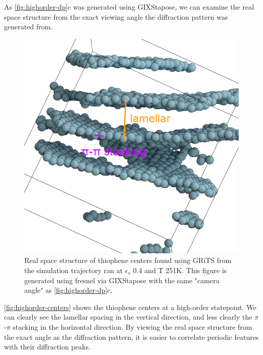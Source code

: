 As \autoref{fig:highorder-dp}c was generated using GIXStapose, we can examine the real space structure from the exact viewing angle the diffraction pattern was generated from. 
\begin{figure}
    \centering
    \includegraphics[width=0.8\linewidth]{figures/p3ht_val/scene_annotated.png}
    \caption{Real space structure of thiophene centers found using GRiTS from the simulation trajectory ran at $\epsilon_{s}$ 0.4 and T 251K. This figure is generated using fresnel via GIXStapose with the same "camera angle" as \autoref{fig:highorder-dp}c. }\label{fig:highorder-centers}
\end{figure}
\autoref{fig:highorder-centers} shows the thiophene centers at a high-order statepoint. We can clearly see the lamellar spacing in the vertical direction, and less clearly the $\pi$-$\pi$ stacking in the horizontal direction. By viewing the real space structure from the exact angle as the diffraction pattern, it is easier to correlate periodic features with their diffraction peaks.

